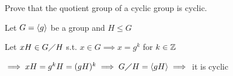 \begin{example}
    Prove that the quotient group of a cyclic group is cyclic.

    Let $G=\left\langle g \right\rangle$ be a group and $H \leq G$

    Let $xH \in G \diagup H$ s.t. $x \in G \implies x=g^k$ for $k \in \mathbb{Z}$

    $\implies xH=g^kH=(gH)^k \implies G \diagup H=\left\langle gH \right\rangle \implies$ it is cyclic
\end{example}
